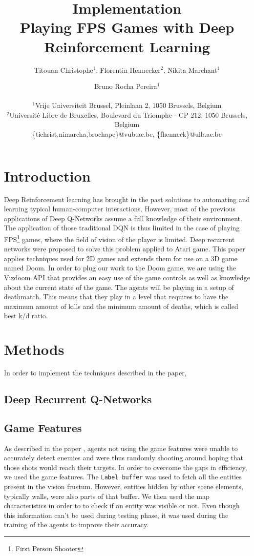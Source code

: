 \documentclass[letterpaper]{article}
\title{Implementation\\Playing FPS Games with Deep Reinforcement Learning}
\author{Titouan Christophe$^{1}$, Florentin Hennecker$^{2}$, Nikita Marchant$^{1}$ \and Bruno Rocha Pereira$^{1}$ \\
\mbox{}\\
$^1$Vrije Universiteit Brussel, Pleinlaan 2, 1050 Brussels, Belgium \\
$^2$Universit\'e Libre de Bruxelles, Boulevard du Triomphe - CP 212, 1050
Brussels, Belgium \\
\{tichrist,nimarcha,brochape\}@vub.ac.be, \{fhenneck\}@ulb.ac.be}
\begin{document}
\maketitle

\begin{abstract}
\end{abstract}

\section{Introduction}
Deep Reinforcement learning has brought in the past solutions to automating and learning typical human-computer interactions. 
However, most of the previous applications of Deep Q-Networks assume a full knowledge of their environment. The application of those traditional DQN is thus limited in the case of playing FPS\footnote{First Person Shooter} games, where the field of vision of the player is limited. Deep recurrent networks were proposed to solve this problem \citep{Hausknecht2015} applied to Atari game. This paper applies techniques used for 2D games and extends them for use on a 3D game named Doom.
In order to plug our work to the Doom game, we are using the Vizdoom API \citep{Kempka2016} that provides an easy use of the game controls as well as knowledge about the current state of the game.
The agents will be playing in a setup of deathmatch. This means that they play in a level that requires to have the maximum amount of kills and the minimum amount of deaths, which is called best k/d ratio.
\section{Methods}
In order to implement the techniques described in the paper,\todo{}

\subsection{Deep Recurrent Q-Networks}

\subsection{Game Features}
As described in the paper \citep{Lample2016}, agents not using the game features were unable to accurately detect enemies and were thus randomly shooting around hoping that those shots would reach their targets. In order to overcome the gaps in efficiency, we used the game features. The \texttt{Label buffer} was used to fetch all the entities present in the vision frustum. However, entities hidden by other scene elements, typically walls, were also parts of that buffer. We then used the map characteristics in order to to check if an entity was visible or not. Even though this information can't be used during testing phase, it was used during the training of the agents to improve their accuracy.
\end{document}
